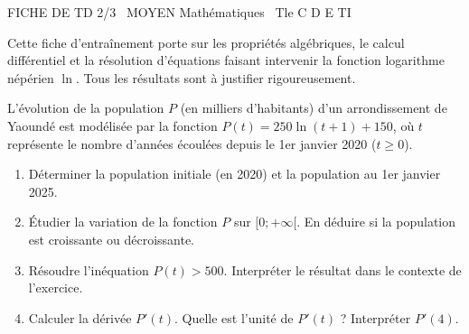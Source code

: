 \documentclass[11pt]{article}
\begin{document}
\begin{tcolorbox}[enhanced,colback=popink,colframe=popink,arc=10pt,boxrule=0pt,left=12pt,right=12pt,top=9pt,bottom=9pt]
{\color{white}\popxbold\small FICHE DE TD 2/3 \textbullet\ MOYEN \hfill Mathématiques \textbullet\ Tle C D E TI\par}
\end{tcolorbox}
\vspace{4pt}
\noindent Cette fiche d'entraînement porte sur les propriétés algébriques, le calcul différentiel et la résolution d'équations faisant intervenir la fonction logarithme népérien $\ln$. Tous les résultats sont à justifier rigoureusement.

\begin{exercice}
L'évolution de la population $P$ (en milliers d'habitants) d'un arrondissement de Yaoundé est modélisée par la fonction $P(t) = 250 \ln(t+1) + 150$, où $t$ représente le nombre d'années écoulées depuis le 1er janvier 2020 ($t \geq 0$).
\begin{enumerate}
    \item Déterminer la population initiale (en 2020) et la population au 1er janvier 2025.
    \item Étudier la variation de la fonction $P$ sur $[0 ; +\infty[$. En déduire si la population est croissante ou décroissante.
    \item Résoudre l'inéquation $P(t) > 500$. Interpréter le résultat dans le contexte de l'exercice.
    \item Calculer la dérivée $P'(t)$. Quelle est l'unité de $P'(t)$ ? Interpréter $P'(4)$.
\end{enumerate}
\end{exercice}
\end{document}
